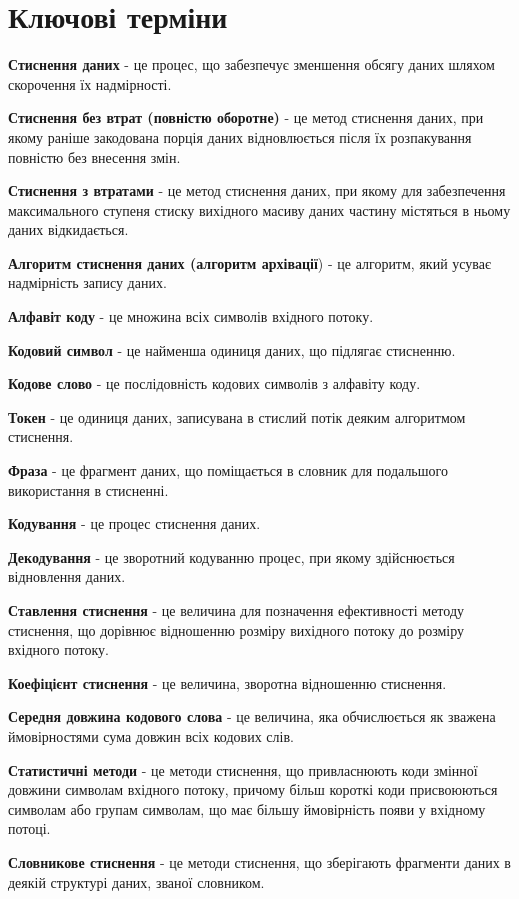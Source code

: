 \section{Ключові терміни}
\nopagebreak[4]

\textbf{Стиснення даних} - це процес, що забезпечує зменшення обсягу даних шляхом скорочення їх надмірності.

\textbf{Стиснення без втрат (повністю оборотне)} - це метод стиснення даних, при якому раніше закодована порція даних відновлюється після їх розпакування повністю без внесення змін.

\textbf{Стиснення з втратами} - це метод стиснення даних, при якому для забезпечення максимального ступеня стиску вихідного масиву даних частину містяться в ньому даних відкидається.

\textbf{Алгоритм стиснення даних (алгоритм архівації}) - це алгоритм, який усуває надмірність запису даних.

\textbf{Алфавіт коду} - це множина всіх символів вхідного потоку.

\textbf{Кодовий символ} - це найменша одиниця даних, що підлягає стисненню.

\textbf{Кодове слово} - це послідовність кодових символів з алфавіту коду.

\textbf{Токен} - це одиниця даних, записувана в стислий потік деяким алгоритмом стиснення.

\textbf{Фраза} - це фрагмент даних, що поміщається в словник для подальшого використання в стисненні.

\textbf{Кодування} - це процес стиснення даних.

\textbf{Декодування} - це зворотний кодуванню процес, при якому здійснюється відновлення даних.

\textbf{Ставлення стиснення} - це величина для позначення ефективності методу стиснення, що дорівнює відношенню розміру вихідного потоку до розміру вхідного потоку.

\textbf{Коефіцієнт стиснення} - це величина, зворотна відношенню стиснення.

\textbf{Середня довжина кодового слова} - це величина, яка обчислюється як зважена ймовірностями сума довжин всіх кодових слів.

\textbf{Статистичні методи} - це методи стиснення, що привласнюють коди змінної довжини символам вхідного потоку, причому більш короткі коди присвоюються символам або групам символам, що має більшу ймовірність появи у вхідному потоці.

\textbf{Словникове стиснення} - це методи стиснення, що зберігають фрагменти даних в деякій структурі даних, званої словником.

